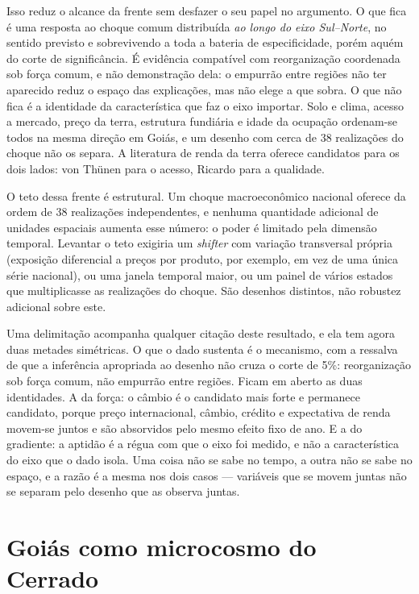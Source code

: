 Isso reduz o alcance da frente sem desfazer o seu papel no argumento. O que
fica é uma resposta ao choque comum distribuída \emph{ao longo do eixo
Sul--Norte}, no sentido previsto e sobrevivendo a toda a bateria de
especificidade, porém aquém do corte de significância. É evidência compatível
com reorganização coordenada sob força comum, e não demonstração dela: o
empurrão entre regiões não ter aparecido reduz o espaço das explicações, mas
não elege a que sobra. O que não fica é a identidade da
característica que faz o eixo importar. Solo e clima, acesso a mercado, preço
da terra, estrutura fundiária e idade da ocupação ordenam-se todos na mesma
direção em Goiás, e um desenho com cerca de 38 realizações do choque não os
separa. A literatura de renda da terra oferece candidatos para os dois lados:
von Thünen para o acesso, Ricardo para a qualidade.

O teto dessa frente é estrutural. Um choque macroeconômico nacional oferece da
ordem de 38 realizações independentes, e nenhuma quantidade adicional de
unidades espaciais aumenta esse número: o poder é limitado pela dimensão
temporal. Levantar o teto exigiria um \emph{shifter} com variação transversal
própria (exposição diferencial a preços por produto, por exemplo, em vez de
uma única série nacional), ou uma janela temporal maior, ou um painel de
vários estados que multiplicasse as realizações do choque. São desenhos
distintos, não robustez adicional sobre este.

Uma delimitação acompanha qualquer citação deste resultado, e ela tem agora
duas metades simétricas. O que o dado sustenta é o
mecanismo, com a ressalva de que a inferência apropriada ao desenho não
cruza o corte de 5\%: reorganização sob força comum, não empurrão entre regiões. Ficam em
aberto as duas identidades. A da força: o câmbio é o candidato mais forte e permanece
candidato, porque preço internacional, câmbio, crédito e expectativa de renda
movem-se juntos e são absorvidos pelo mesmo efeito fixo de ano. E a do
gradiente: a aptidão é a régua com que o eixo foi medido, e não a característica
do eixo que o dado isola. Uma coisa não se sabe no tempo, a outra não se sabe
no espaço, e a razão é a mesma nos dois casos --- variáveis que se movem juntas
não se separam pelo desenho que as observa juntas.

\section{Goiás como microcosmo do Cerrado}
\label{sec:disc-matopiba}

